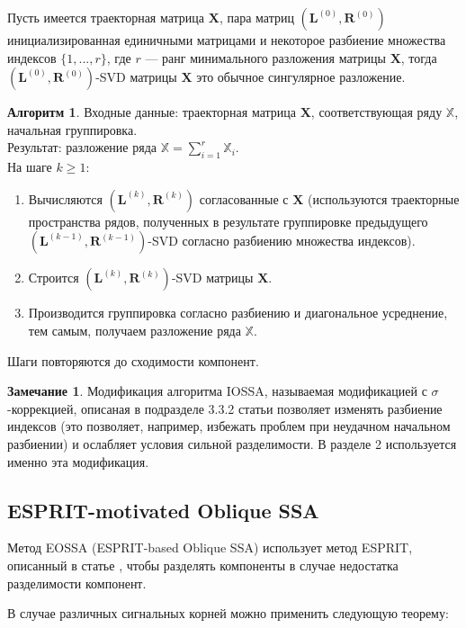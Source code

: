 \documentclass[specialist, substylefile = spbureport.rtx, subf,href,colorlinks=true, 12pt]{disser}
\theoremstyle{definition}
\newtheorem{algorithm}{Алгоритм}
\newtheorem{remark}{Замечание}
\begin{document}
    Пусть имеется траекторная матрица $\mathbf{X}$, пара матриц $(\mathbf{L}^{(0)}, \mathbf{R}^{(0)})$ инициализированная единичными матрицами и некоторое разбиение множества индексов $\{ 1,...,r\}$, где $r$ --- ранг минимального разложения матрицы $\mathbf{X}$, тогда $(\mathbf{L}^{(0)}, \mathbf{R}^{(0)})$-SVD матрицы $\mathbf{X}$ это обычное сингулярное разложение.
    \begin{algorithm}
    Входные данные: траекторная матрица $\mathbf{X}$, соответствующая ряду $\mathbb{X}$, начальная группировка.
    \\ Результат: разложение ряда $\mathbb{X} = \sum_{i = 1}^{r}\mathbb{X}_i$.\\
        На шаге $k \geq 1$:
        \begin{enumerate}
            \item Вычисляются $(\mathbf{L}^{(k)}, \mathbf{R}^{(k)})$ согласованные с $\mathbf{X}$ (используются траекторные пространства рядов, полученных в результате группировке предыдущего $(\mathbf{L}^{(k - 1)}, \mathbf{R}^{(k - 1)})$-SVD согласно разбиению множества индексов).
            \item Строится $(\mathbf{L}^{(k)}, \mathbf{R}^{(k)})$-SVD матрицы $\mathbf{X}$.
            \item Производится группировка согласно разбиению и диагональное усреднение, тем самым, получаем разложение ряда $\mathbb{X}$.
        \end{enumerate}
        Шаги повторяются до сходимости компонент.
    \end{algorithm}
    \begin{remark}
        Модификация алгоритма IOSSA, называемая модификацией с $\sigma$-коррекцией, описаная в подразделе 3.3.2 статьи \cite{Golyandina15} позволяет изменять разбиение индексов (это позволяет, например, избежать проблем при неудачном начальном разбиении) и ослабляет условия сильной разделимости. В разделе 2 используется именно эта модификация.
    \end{remark}

    \subsection{ESPRIT-motivated Oblique SSA}

Метод EOSSA (ESPRIT-based Oblique SSA) использует метод ESPRIT, описанный в статье \cite{Roy89}, чтобы разделять компоненты в случае недостатка разделимости компонент.

В случае различных сигнальных корней можно применить следующую теорему:
\end{document}
